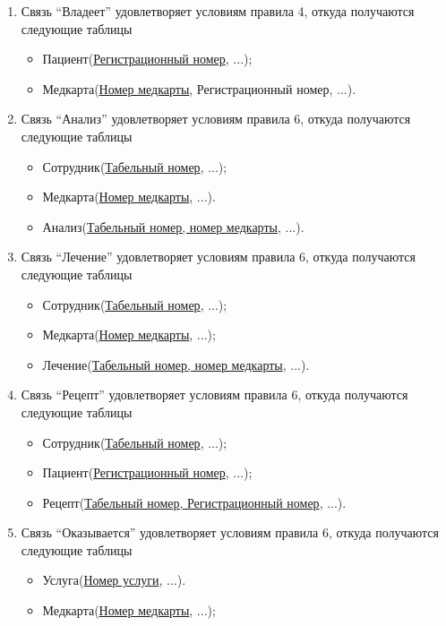 \documentclass[14pt,a4paper,russian]{extreport}
\begin{document}
\begin{enumerate}
    \item Связь ``Владеет'' удовлетворяет условиям правила 4, откуда получаются следующие таблицы
        \begin{itemize}
            \item Пациент(\underline{Регистрационный номер}, ...);
            \item Медкарта(\underline{Номер медкарты}, Регистрационный номер, ...).
        \end{itemize}
    \item Связь ``Анализ'' удовлетворяет условиям правила 6, откуда получаются следующие
        таблицы
        \begin{itemize}
            \item Сотрудник(\underline{Табельный номер}, ...);
            \item Медкарта(\underline{Номер медкарты}, ...).
            \item Анализ(\underline{Табельный номер, номер медкарты}, ...).
        \end{itemize}
    \item Связь ``Лечение'' удовлетворяет условиям правила 6, откуда получаются следующие таблицы
        \begin{itemize}
            \item Сотрудник(\underline{Табельный номер}, ...);
            \item Медкарта(\underline{Номер медкарты}, ...);
            \item Лечение(\underline{Табельный номер, номер медкарты}, ...).
        \end{itemize}
    \item Связь ``Рецепт'' удовлетворяет условиям правила 6, откуда получаются следующие таблицы
        \begin{itemize}
            \item Сотрудник(\underline{Табельный номер}, ...);
            \item Пациент(\underline{Регистрационный номер}, ...);
            \item Рецепт(\underline{Табельный номер, Регистрационный номер}, ...).
        \end{itemize}
    \item Связь ``Оказывается'' удовлетворяет условиям правила 6, откуда получаются следующие
        таблицы
        \begin{itemize}
            \item Услуга(\underline{Номер услуги}, ...).
            \item Медкарта(\underline{Номер медкарты}, ...);

\end{itemize}
\end{enumerate}
\end{document}
